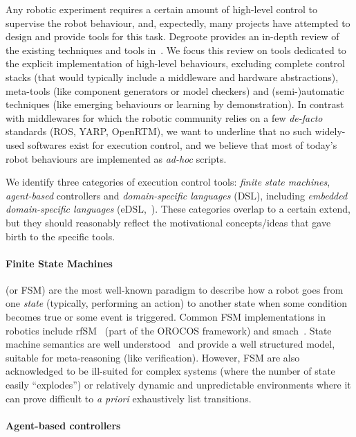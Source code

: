 \documentclass[a4paper, 10pt, conference]{ieeeconf}      %
\begin{document}
Any robotic experiment requires a certain amount of high-level control to
supervise the robot behaviour, and, expectedly, many projects have attempted to
design and provide tools for this task. Degroote provides an in-depth review of
the existing techniques and tools in~\cite{degroote2012architecture}. We focus
this review on tools dedicated to the explicit implementation of high-level
behaviours, excluding complete control stacks (that would typically include a
middleware and hardware abstractions), meta-tools (like component generators or
model checkers) and (semi-)automatic techniques (like emerging behaviours or
learning by demonstration).  In contrast with middlewares for which the robotic
community relies on a few \emph{de-facto} standards (ROS, YARP, OpenRTM), we
want to underline that no such widely-used softwares exist for execution
control, and we believe that most of today's robot behaviours are implemented as
\emph{ad-hoc} scripts.

We identify three categories of execution control tools: \emph{finite state
machines}, \emph{agent-based} controllers and
\emph{domain-specific languages} (DSL), including \emph{embedded domain-specific
languages} (eDSL,~\cite{joyeux2011robot}). These categories overlap to a certain
extend, but they should reasonably reflect the motivational concepts/ideas that
gave birth to the specific tools.

\paragraph{Finite State Machines} (or FSM) are the most well-known paradigm to
describe how a robot goes from one \emph{state} (typically, performing an
action) to another state when some condition becomes true or some event is
triggered. Common FSM implementations in robotics include {\sc
rfSM}~\cite{klotzbucher2010orocos} (part of the OROCOS framework) and
{\sc smach}~\cite{bohren2010smach}. State machine semantics are well
understood~\cite{harel1996statemate} and provide a well structured model,
suitable for meta-reasoning (like verification). However, FSM are also
acknowledged to be ill-suited for complex systems (where the number of state
easily ``explodes'') or relatively dynamic and unpredictable environments where
it can prove difficult to \textit{a priori} exhaustively list transitions.


\paragraph{Agent-based controllers}
\end{document}
